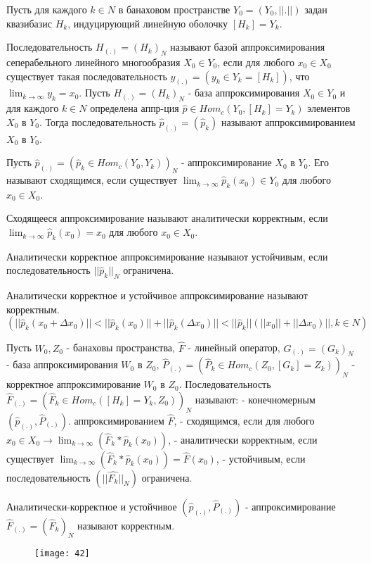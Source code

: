 \documentclass[__main__.tex]{subfiles}
\begin{document}
Пусть для каждого $k \in N$ в банаховом пространстве $Y_0 = (Y_0, ||.||)$ задан квазибазис $H_k$, индуцирующий линейную оболочку $[H_k] = Y_k$.
\begin{definition}
 Последовательность $H_{(.)} = (H_k)_N$ называют базой аппроксимирования сеперабельного линейного многообразия $X_0 \in Y_0$, если для любого $x_0 \in X_0$ существует такая последовательность $y_{(.)} = (y_k \in Y_k = [H_k])$, что $\lim_{k \rightarrow \infty} y_k = x_0$. Пусть $H_{(.)} = (H_k)_N$ - база аппроксимирования $X_0 \in Y_0$ и для каждого $k \in N$ определена аппр-ция $\hat{p} \in Hom_{c}(Y_0, [H_k] = Y_k)$ элементов $X_0$ в $Y_0$. Тогда последовательность $\hat{p}_{(.)} = (\hat{p}_k)$ называют аппроксимированием $X_0$ в $Y_0$.
\end{definition}
\begin{definition}
Пусть $\hat{p}_{(.)} = (\hat{p}_{k} \in Hom_{c}(Y_0, Y_k))_N$ - аппроксимирование $X_0$ в $Y_0$. Его называют сходящимся, если существует $\lim_{k \rightarrow \infty}\hat{p}_{k}(x_0) \in Y_0$ для любого $x_0 \in X_0$.
\end{definition}
\begin{definition}
 Сходящееся аппроксимирование называют аналитически корректным, если $\lim_{k \rightarrow \infty}\hat{p}_{k}(x_0) = x_0$ для любого $x_0 \in X_0$.
\end{definition}
\begin{definition}
	Аналитически корректное аппроксимирование называют устойчивым, если последовательность $||\hat{p}_{k}||_N$ ограничена.
\end{definition}
\begin{definition}
	Аналитически корректное и устойчивое аппроксимирование называют корректным.
	$(||\hat{p}_{k}(x_0 + \Delta x_0)|| < ||\hat{p}_{k}(x_0)|| + ||\hat{p}_{k}(\Delta x_0)|| < ||\hat{p}_{k}||(||x_0|| + ||\Delta x_0)||, k \in N)$
\end{definition}
\begin{definition}
	Пусть $W_0, Z_0$ - банаховы пространства, $\hat{F}$ - линейный оператор, $G_{(.)} = (G_k)_N$ - база аппроксимирования $W_0$ в $Z_0$, $\hat{P}_{(.)} = (\hat{P}_{k} \in Hom_{c}(Z_0, [G_k] = Z_k))_N$ - корректное аппроксимирование $W_0$ в $Z_0$.
	Последовательность $\hat{F}_{(.)} = (\hat{F}_{k} \in Hom_{c}([H_k] = Y_k, Z_0))_N$ называют:
	- конечномерным $(\hat{p}_{(.)},\hat{P}_{(.)})$. аппроксимированием $\hat{F}$,
	- сходящимся, если для любого $x_0 \in X_0 \rightarrow \lim_{k \rightarrow \infty} (\hat{F}_{k} * \hat{p}_{k}(x_0))$,
	- аналитически корректным, если существует $\lim_{k \rightarrow \infty} (\hat{F}_{k} * \hat{p}_{k}(x_0)) = \hat{F}(x_0)$,
	- устойчивым, если последовательность $(||\hat{F_{k}}||_N)$ ограничена.
\end{definition}

\begin{definition}
Аналитически-корректное и устойчивое $(\hat{p}_{(.)},\hat{P}_{(.)})$ - аппроксимирование $\hat{F}_{(.)} = (\hat{F}_{k})_N$ называют корректным.
\end{definition}
\begin{figure}[h]
	\centering
	\texttt{[image: 42]}
	\caption{ }
\end{figure}
\end{document}
